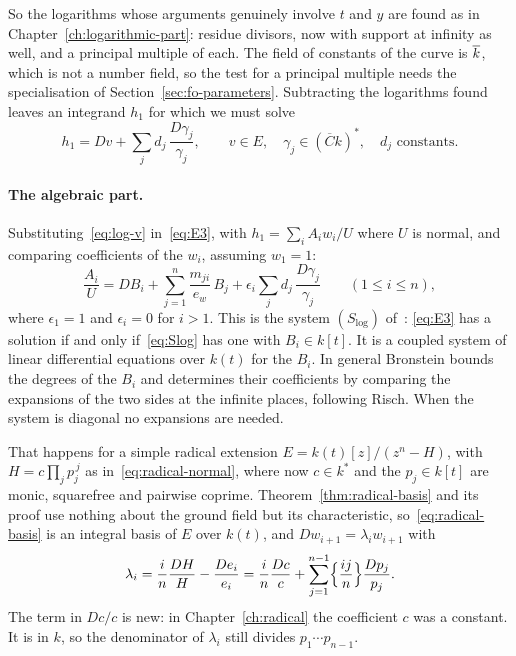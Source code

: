 So the logarithms whose arguments genuinely involve $t$ and $y$ are found as
in Chapter~\ref{ch:logarithmic-part}: residue divisors, now with support at
infinity as well, and a principal multiple of each. The field of constants of
the curve is $\overline{k}$, which is not a number field, so the test for a
principal multiple needs the specialisation of
Section~\ref{sec:fo-parameters}. Subtracting the logarithms found leaves an
integrand $h_1$ for which we must solve
\begin{equation}\label{eq:E3}
  h_1 = Dv + \sum_j d_j\, \frac{D\gamma_j}{\gamma_j}, \qquad
  v \in E, \quad \gamma_j \in (\overline{C} k)^*, \quad d_j \text{ constants.}
\end{equation}

\paragraph{The algebraic part.} Substituting~\eqref{eq:log-v}
in~\eqref{eq:E3}, with $h_1 = \sum_i A_i w_i / U$ where $U$ is normal, and
comparing coefficients of the $w_i$, assuming $w_1 = 1$:
\begin{equation}\label{eq:Slog}
  \frac{A_i}{U} = DB_i + \sum_{j=1}^n \frac{m_{ji}}{e_w}\, B_j
     + \epsilon_i \sum_j d_j\, \frac{D\gamma_j}{\gamma_j}
  \qquad (1 \le i \le n),
\end{equation}
where $\epsilon_1 = 1$ and $\epsilon_i = 0$ for $i > 1$. This is the system
$(S_{\log})$ of~\cite[Proposition~2.15]{bronstein1990}: \eqref{eq:E3} has a
solution if and only if~\eqref{eq:Slog} has one with $B_i \in k[t]$. It is a
coupled system of linear differential equations over $k(t)$ for the $B_i$.
In general Bronstein bounds the degrees of the $B_i$
\cite[Proposition~2.14]{bronstein1990} and determines their coefficients by
comparing the expansions of the two sides at the infinite places, following
Risch. When the system is diagonal no expansions are needed.

That happens for a simple radical extension $E = k(t)[z]/(z^n - H)$, with
$H = c \prod_j p_j^{\,j}$ as in~\eqref{eq:radical-normal}, where now $c \in
k^*$ and the $p_j \in k[t]$ are monic, squarefree and pairwise coprime.
Theorem~\ref{thm:radical-basis} and its proof use nothing about the ground
field but its characteristic, so~\eqref{eq:radical-basis} is an integral
basis of $E$ over $k(t)$, and $Dw_{i+1} = \lambda_i w_{i+1}$ with
\[
  \lambda_i = \frac{i}{n} \frac{DH}{H} - \frac{De_i}{e_i}
            = \frac{i}{n} \frac{Dc}{c}
              + \sum_{j=1}^{n-1} \Bigl\{ \frac{ij}{n} \Bigr\} \frac{Dp_j}{p_j} .
\]
The term in $Dc/c$ is new: in Chapter~\ref{ch:radical} the coefficient $c$
was a constant. It is in $k$, so the denominator of $\lambda_i$ still divides
$p_1 \cdots p_{n-1}$.

